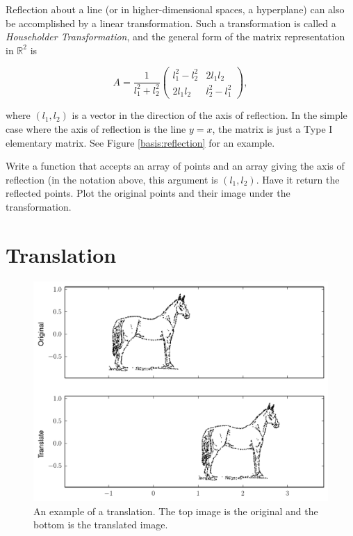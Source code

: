 Reflection about a line (or in higher-dimensional spaces, a hyperplane) can also be accomplished by a linear transformation. Such a transformation is called a \emph{Householder Transformation}, and the general form of the matrix representation in
$\mathbb{R}^2$ is

\[
A = \frac{1}{l_1^2 + l_2^2}
\begin{pmatrix}
l_1^2 - l_2^2 & 2l_1l_2 \\
2l_1l_2 & l_2^2 - l_1^2
\end{pmatrix},
\]

where $(l_1, l_2)$ is a vector in the direction of the axis of reflection. In the simple case where the axis of reflection is the line $y=x$, the matrix is just a Type I elementary matrix. See Figure \ref{basis:reflection} for an example.

\begin{problem}
Write a function that accepts an array of points and an array giving the axis of reflection (in the notation above, this argument is $(l_1, l_2)$. Have it return the reflected points.
Plot the original points and their image under the transformation.
\end{problem}

\section*{Translation}

\begin{figure}
\includegraphics[width=\textwidth]{translate.pdf}
\caption{
An example of a translation.
The top image is the original and the bottom is the translated image.}
\label{basis:translate}
\end{figure}

